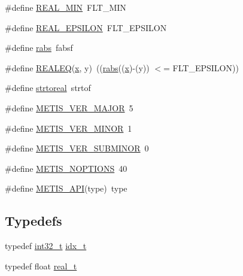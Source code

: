 \begin{DoxyCompactItemize}
\#define \hyperlink{3rd_party_2parmetis-4_80_83_2metis_2include_2metis_8h_ae19c49417e2720027ed571edc915b5f2}{R\+E\+A\+L\+\_\+\+M\+IN}~F\+L\+T\+\_\+\+M\+IN
\item 
\#define \hyperlink{3rd_party_2parmetis-4_80_83_2metis_2include_2metis_8h_a268bd688a4b5c8bb1c12bfdb92e27a1d}{R\+E\+A\+L\+\_\+\+E\+P\+S\+I\+L\+ON}~F\+L\+T\+\_\+\+E\+P\+S\+I\+L\+ON
\item 
\#define \hyperlink{3rd_party_2parmetis-4_80_83_2metis_2include_2metis_8h_a5f027fb1242f417e1631cc5e1c67ce0d}{rabs}~fabsf
\item 
\#define \hyperlink{3rd_party_2parmetis-4_80_83_2metis_2include_2metis_8h_af7ffa47809b85f79ddc368e67705d5b3}{R\+E\+A\+L\+EQ}(\hyperlink{cubic2linear_8m_ac98c3bb25378222646e977292011625f}{x},  y)~((\hyperlink{include_2metis_8h_a5f027fb1242f417e1631cc5e1c67ce0d}{rabs}((\hyperlink{cubic2linear_8m_ac98c3bb25378222646e977292011625f}{x})-\/(y)) $<$= F\+L\+T\+\_\+\+E\+P\+S\+I\+L\+ON))
\item 
\#define \hyperlink{3rd_party_2parmetis-4_80_83_2metis_2include_2metis_8h_a06c5f8b869d94ca0172612a9d102f6cf}{strtoreal}~strtof
\item 
\#define \hyperlink{3rd_party_2parmetis-4_80_83_2metis_2include_2metis_8h_a5b0167ec187274a9cf0a89bce6b36738}{M\+E\+T\+I\+S\+\_\+\+V\+E\+R\+\_\+\+M\+A\+J\+OR}~5
\item 
\#define \hyperlink{3rd_party_2parmetis-4_80_83_2metis_2include_2metis_8h_aa4bd7d2023e4c66c792060aae10307d9}{M\+E\+T\+I\+S\+\_\+\+V\+E\+R\+\_\+\+M\+I\+N\+OR}~1
\item 
\#define \hyperlink{3rd_party_2parmetis-4_80_83_2metis_2include_2metis_8h_a3ce4c253b26a346c2251594b15ad0f4b}{M\+E\+T\+I\+S\+\_\+\+V\+E\+R\+\_\+\+S\+U\+B\+M\+I\+N\+OR}~0
\item 
\#define \hyperlink{3rd_party_2parmetis-4_80_83_2metis_2include_2metis_8h_aa33cc5931473a308b9973ce911cfd16a}{M\+E\+T\+I\+S\+\_\+\+N\+O\+P\+T\+I\+O\+NS}~40
\item 
\#define \hyperlink{3rd_party_2parmetis-4_80_83_2metis_2include_2metis_8h_aa9e279790a754187de6212e08f098131}{M\+E\+T\+I\+S\+\_\+\+A\+PI}(type)~type
\end{DoxyCompactItemize}
\subsection*{Typedefs}
\begin{DoxyCompactItemize}
\item 
typedef \hyperlink{ms__stdint_8h_a37994e3b11c72957c6f454c6ec96d43d}{int32\+\_\+t} \hyperlink{3rd_party_2parmetis-4_80_83_2metis_2include_2metis_8h_aaa5262be3e700770163401acb0150f52}{idx\+\_\+t}
\item 
typedef float \hyperlink{3rd_party_2parmetis-4_80_83_2metis_2include_2metis_8h_a1924a4f6907cc3833213aba1f07fcbe9}{real\+\_\+t}
\end{DoxyCompactItemize}
